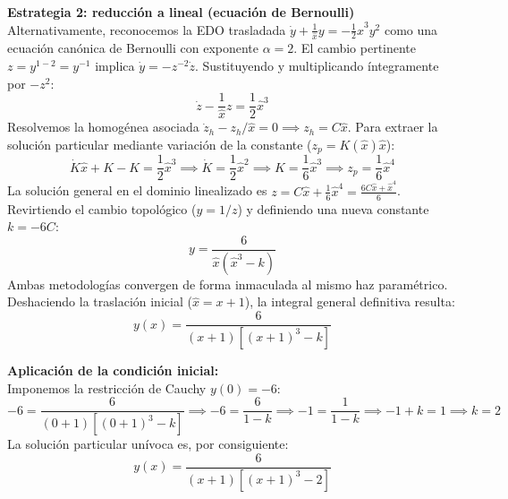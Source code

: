 \documentclass[11pt,a4paper]{article}
\theoremstyle{definition}
\theoremstyle{plain}
\begin{document}
\begin{tcolorbox}
\textbf{Estrategia 2: reducción a lineal (ecuación de Bernoulli)} \\
Alternativamente, reconocemos la EDO trasladada $\dot{y} + \frac{1}{\hat{x}}y = -\frac{1}{2}\hat{x}^3 y^2$ como una ecuación canónica de Bernoulli con exponente $\alpha = 2$.
El cambio pertinente $z = y^{1-2} = y^{-1}$ implica $\dot{y} = -z^{-2}\dot{z}$.
Sustituyendo y multiplicando íntegramente por $-z^2$:
$$ \dot{z} - \frac{1}{\hat{x}}z = \frac{1}{2}\hat{x}^3 $$
Resolvemos la homogénea asociada $\dot{z}_h - z_h/\hat{x} = 0 \implies z_h = C\hat{x}$.
Para extraer la solución particular mediante variación de la constante ($z_p = K(\hat{x})\hat{x}$):
$$ \dot{K}\hat{x} + K - K = \frac{1}{2}\hat{x}^3 \implies \dot{K} = \frac{1}{2}\hat{x}^2 \implies K = \frac{1}{6}\hat{x}^3 \implies z_p = \frac{1}{6}\hat{x}^4 $$
La solución general en el dominio linealizado es $z = C\hat{x} + \frac{1}{6}\hat{x}^4 = \frac{6C\hat{x} + \hat{x}^4}{6}$.
Revirtiendo el cambio topológico ($y = 1/z$) y definiendo una nueva constante $k = -6C$:
$$ y = \frac{6}{\hat{x}(\hat{x}^3 - k)} $$
Ambas metodologías convergen de forma inmaculada al mismo haz paramétrico. Deshaciendo la traslación inicial ($\hat{x} = x+1$), la integral general definitiva resulta:
$$ y(x) = \frac{6}{(x+1)[(x+1)^3 - k]} $$

\textbf{Aplicación de la condición inicial:} \\
Imponemos la restricción de Cauchy $y(0) = -6$:
$$ -6 = \frac{6}{(0+1)[(0+1)^3 - k]} \implies -6 = \frac{6}{1 - k} \implies -1 = \frac{1}{1-k} \implies -1 + k = 1 \implies k = 2 $$
La solución particular unívoca es, por consiguiente:
$$ y(x) = \frac{6}{(x+1)[(x+1)^3 - 2]} $$

\begin{figure}[H]
    \centering
\end{figure}
\end{tcolorbox}
\end{document}
